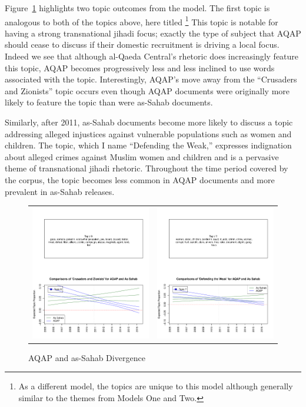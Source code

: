 Figure~\ref{fig:crusaders} highlights two topic outcomes from the model.  The first topic is analogous to both of the  topics above, here titled  \footnote{As a different model, the topics are unique to this model although generally similar to the themes from Models One and Two.}  This topic is notable for having a strong transnational jihadi focus; exactly the type of subject that AQAP should cease to discuss if their domestic recruitment is
driving a local focus. Indeed we see that although al-Qaeda Central's
rhetoric does increasingly feature this topic, AQAP becomes
progressively less and less inclined to use words associated with the
topic. Interestingly, AQAP's move away from the ``Crusaders and
Zionists'' topic occurs even though AQAP documents were originally more likely to feature the topic than were as-Sahab documents.

Similarly, after 2011, as-Sahab documents become more likely to
discuss a topic addressing alleged injustices against vulnerable
populations such as women and children. The topic, which I name ``Defending
the Weak,'' expresses indignation about alleged crimes against Muslim
women and children and is a pervasive theme of transnational jihadi
rhetoric. Throughout the time period covered by the corpus, the topic
becomes less common in AQAP documents and more prevalent in as-Sahab releases. 

\begin{figure}
\begin{center}
  \caption{AQAP and as-Sahab Divergence}
  \label{fig:crusaders}
  \begin{tabular}{cc}
\includegraphics[width=.45\columnwidth]{./Pictures/34TopicsComparisonCrusaderZionists2.pdf}&
\includegraphics[width=.45\columnwidth]{./Pictures/34DefenseofWomen.pdf}\\
  \end{tabular}
\end{center}
 \end{figure}
